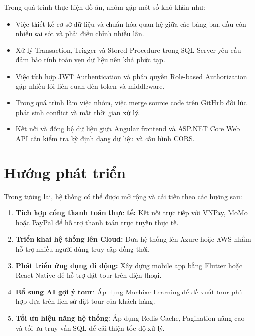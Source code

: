 Trong quá trình thực hiện đồ án, nhóm gặp một số khó khăn như:

\begin{itemize}

  \item Việc thiết kế cơ sở dữ liệu và chuẩn hóa quan hệ giữa các bảng
  ban đầu còn nhiều sai sót và phải điều chỉnh nhiều lần.

  \item Xử lý Transaction, Trigger và Stored Procedure trong SQL Server
  yêu cầu đảm bảo tính toàn vẹn dữ liệu nên khá phức tạp.

  \item Việc tích hợp JWT Authentication và phân quyền
  Role-based Authorization gặp nhiều lỗi liên quan đến token và middleware.

  \item Trong quá trình làm việc nhóm, việc merge source code trên GitHub
  đôi lúc phát sinh conflict và mất thời gian xử lý.

  \item Kết nối và đồng bộ dữ liệu giữa Angular frontend và
  ASP.NET Core Web API cần kiểm tra kỹ định dạng dữ liệu và cấu hình CORS.

\end{itemize}


\section{Hướng phát triển}\label{Sec5.4}

Trong tương lai, hệ thống có thể được mở rộng và cải tiến theo các hướng sau:

\begin{enumerate}

  \item \textbf{Tích hợp cổng thanh toán thực tế:}
  Kết nối trực tiếp với VNPay, MoMo hoặc PayPal để hỗ trợ thanh toán trực tuyến thực tế.

  \item \textbf{Triển khai hệ thống lên Cloud:}
  Đưa hệ thống lên Azure hoặc AWS nhằm hỗ trợ nhiều người dùng truy cập đồng thời.

  \item \textbf{Phát triển ứng dụng di động:}
  Xây dựng mobile app bằng Flutter hoặc React Native để hỗ trợ đặt tour trên điện thoại.

  \item \textbf{Bổ sung AI gợi ý tour:}
  Áp dụng Machine Learning để đề xuất tour phù hợp dựa trên lịch sử đặt tour của khách hàng.

  \item \textbf{Tối ưu hiệu năng hệ thống:}
  Áp dụng Redis Cache, Pagination nâng cao và tối ưu truy vấn SQL để cải thiện tốc độ xử lý.

\end{enumerate}

